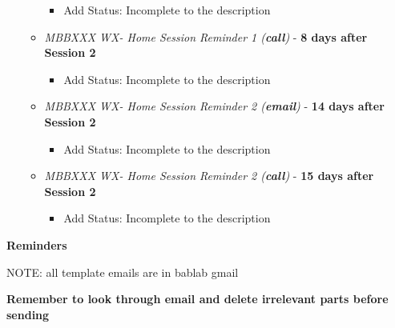 \documentclass[
]{book}
\providecommand{\tightlist}{%
  \setlength{\itemsep}{0pt}\setlength{\parskip}{0pt}}
\begin{document}
\begin{itemize}
\begin{itemize}
    \begin{itemize}
    \tightlist
    \item
      Add Status: Incomplete to the description
    \end{itemize}
  \item
    \emph{MBBXXX WX- Home Session Reminder 1 (\textbf{call})} - \textbf{8 days after Session 2}

    \begin{itemize}
    \tightlist
    \item
      Add Status: Incomplete to the description
    \end{itemize}
  \item
    \emph{MBBXXX WX- Home Session Reminder 2 (\textbf{email})} - \textbf{14 days after Session 2}

    \begin{itemize}
    \tightlist
    \item
      Add Status: Incomplete to the description
    \end{itemize}
  \item
    \emph{MBBXXX WX- Home Session Reminder 2 (\textbf{call})} - \textbf{15 days after Session 2}

    \begin{itemize}
    \tightlist
    \item
      Add Status: Incomplete to the description
    \end{itemize}
  \end{itemize}
\end{itemize}

\textbf{Reminders}

NOTE: all template emails are in bablab gmail

\textbf{Remember to look through email and delete irrelevant parts before sending}
\end{document}

